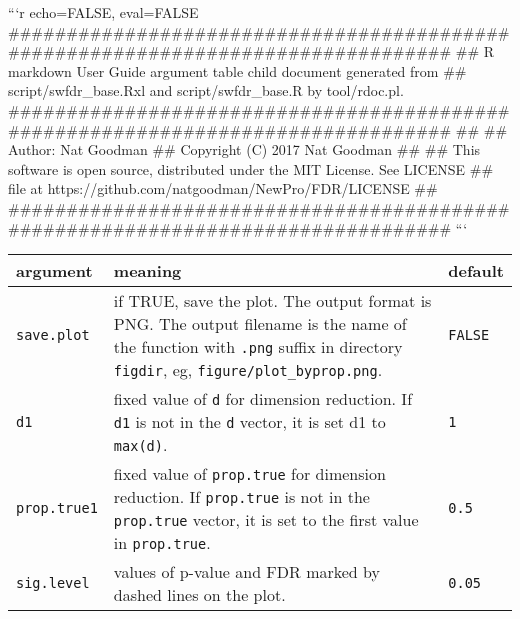 ```{r echo=FALSE, eval=FALSE}
#################################################################################
## R markdown User Guide argument table child document generated from 
## script/swfdr_base.Rxl and script/swfdr_base.R by tool/rdoc.pl.
#################################################################################
##
## Author:  Nat Goodman
## Copyright (C) 2017 Nat Goodman
##
## This software is open source, distributed under the MIT License. See LICENSE
## file at https://github.com/natgoodman/NewPro/FDR/LICENSE
##
#################################################################################
```
\begingroup
\setlength{\tabcolsep}{10pt}
\renewcommand{\arraystretch}{1.2}
\centering
\begin{tabular}{m{}m{}m{}}
\toprule
argument & meaning & default\\
\midrule
\texttt{save.plot} & if TRUE, save the plot. The output format is PNG. The output filename is the name of the function with \texttt{.png} suffix  in directory \texttt{figdir}, eg, \texttt{figure/plot\_byprop.png}. & \texttt{FALSE} \\
\texttt{d1} & fixed value of \texttt{d} for dimension reduction. If \texttt{d1} is not in the \texttt{d} vector, it is set d1 to \texttt{max(d)}. & \texttt{1} \\
\texttt{prop.true1} & fixed value of \texttt{prop.true} for dimension reduction. If \texttt{prop.true} is not in the \texttt{prop.true} vector, it is set to the first value in \texttt{prop.true}. & \texttt{0.5} \\
\texttt{sig.level} & values of p-value and FDR marked by dashed lines on the plot. & \texttt{0.05} \\
\bottomrule
\end{tabular}
\endgroup
